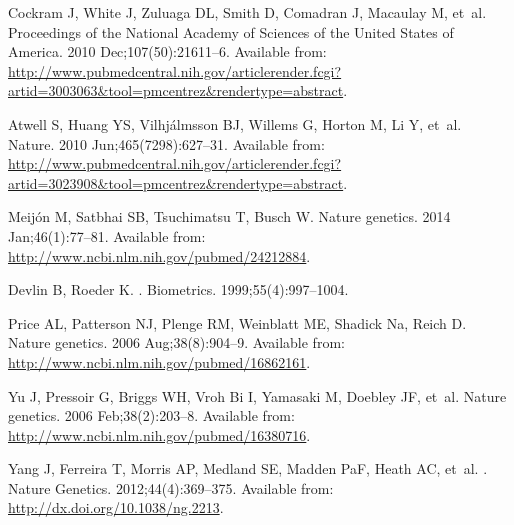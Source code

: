 \documentclass[10pt,letterpaper]{article}
\begin{document}
\begin{thebibliography}{10}
Cockram J, White J, Zuluaga DL, Smith D, Comadran J, Macaulay M, et~al.
\newblock Proceedings of the National Academy of Sciences of the United States
  of America. 2010 Dec;107(50):21611--6.
\newblock Available from:
  \url{http://www.pubmedcentral.nih.gov/articlerender.fcgi?artid=3003063\&tool=pmcentrez\&rendertype=abstract}.

Atwell S, Huang YS, Vilhj\'{a}lmsson BJ, Willems G, Horton M, Li Y, et~al.
\newblock Nature. 2010 Jun;465(7298):627--31.
\newblock Available from:
  \url{http://www.pubmedcentral.nih.gov/articlerender.fcgi?artid=3023908\&tool=pmcentrez\&rendertype=abstract}.

Meij\'{o}n M, Satbhai SB, Tsuchimatsu T, Busch W.
\newblock Nature genetics. 2014 Jan;46(1):77--81.
\newblock Available from: \url{http://www.ncbi.nlm.nih.gov/pubmed/24212884}.

Devlin B, Roeder K.
.
\newblock Biometrics. 1999;55(4):997--1004.

Price AL, Patterson NJ, Plenge RM, Weinblatt ME, Shadick Na, Reich D.
\newblock Nature genetics. 2006 Aug;38(8):904--9.
\newblock Available from: \url{http://www.ncbi.nlm.nih.gov/pubmed/16862161}.

Yu J, Pressoir G, Briggs WH, {Vroh Bi} I, Yamasaki M, Doebley JF, et~al.
\newblock Nature genetics. 2006 Feb;38(2):203--8.
\newblock Available from: \url{http://www.ncbi.nlm.nih.gov/pubmed/16380716}.

Yang J, Ferreira T, Morris AP, Medland SE, Madden PaF, Heath AC, et~al.
.
\newblock Nature Genetics. 2012;44(4):369--375.
\newblock Available from: \url{http://dx.doi.org/10.1038/ng.2213}.


\end{thebibliography}
\end{document}
